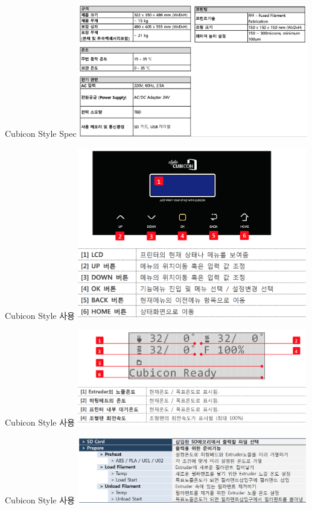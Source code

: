 \documentclass[11pt]{beamer}
\begin{document}
\begin{frame}[t]{Cubicon Style Spec}\footnotesize
	\centering
	\includegraphics[width=10cm]{./image/18_10.png}
\end{frame}


\begin{frame}[t]{Cubicon Style 사용}\footnotesize
	\centering
	\includegraphics[width=10cm]{./image/18_11.png}
\end{frame}

\begin{frame}[t]{Cubicon Style 사용}\footnotesize
	\centering
	\includegraphics[width=10cm]{./image/18_12.png}
\end{frame}

\begin{frame}[t]{Cubicon Style 사용}\footnotesize
	\centering
	\includegraphics[width=10cm]{./image/18_13.png}
\end{frame}
\end{document}
